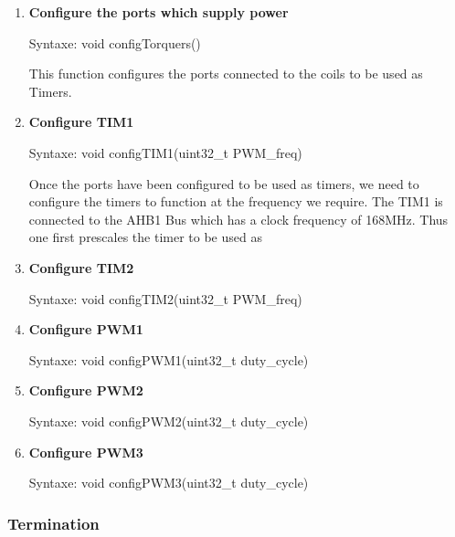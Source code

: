 \documentclass[11pt,a4paper]{report}
\begin{document}
\begin{enumerate}
\item 
	\textbf{Configure the ports which supply power}
	
	Syntaxe: void configTorquers()
	
	This function configures the ports connected to the coils to be used as Timers. 
	
	\begin{table}[H]
		\centering
\caption{Configure the ports as Timers}
\label{config_torquers}
\end{table}

\item 
	\textbf{Configure TIM1}
	
	Syntaxe: void configTIM1(uint32\_t PWM\_freq)
	
	Once the ports have been configured to be used as timers, we need to configure the timers to function at the frequency we require. The TIM1 is connected to the AHB1 Bus which has a clock frequency of 168MHz. Thus one first prescales the timer to be used as 

\item 
	\textbf{Configure TIM2}
	
	Syntaxe: void configTIM2(uint32\_t PWM\_freq)
	
\item 
	\textbf{Configure PWM1 }
	
	Syntaxe: void configPWM1(uint32\_t duty\_cycle)

\item 
	\textbf{Configure PWM2 }
	
	Syntaxe: void configPWM2(uint32\_t duty\_cycle)
	

\item 
	\textbf{Configure PWM3 }
	
	Syntaxe: void configPWM3(uint32\_t duty\_cycle)
\end{enumerate}

\subsubsection{Termination}
\end{document}
